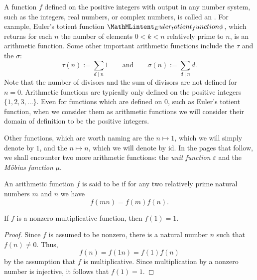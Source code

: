 A function $f$ defined on the positive integers with output in any number system, such as the integers, real numbers, or complex numbers, is called an . For example, Euler's totient function $\totient$, which returns for each $n$ the number of elements $0<k<n$ relatively prime to $n$, is an arithmetic function. Some other important arithmetic functions include the  $\tau$ and the  $\sigma$:
\begin{equation*}
  \tau(n) := \sum_{d\mid n}1\qquad\text{and}\qquad \sigma(n) := \sum_{d\mid n}d.
\end{equation*}
Note that the number of divisors and the sum of divisors are not defined for $n=0$. Arithmetic functions are typically only defined on the positive integers $\{1,2,3,\ldots\}$. Even for functions which are defined on $0$, such as Euler's totient function, when we consider them as arithmetic functions we will consider their domain of definition to be the positive integers.

Other functions, which are worth naming are the  $n\mapsto 1$, which we will simply denote by $1$, and the  $n\mapsto n$, which we will denote by $\mathrm{id}$. In the pages that follow, we shall encounter two more arithmetic functions: the \emph{unit function} $\varepsilon$ and the \emph{M\"obius function} $\mu$.

\begin{definition}
  An arithmetic function $f$ is said to be  if for any two relatively prime natural numbers $m$ and $n$ we have
  \begin{equation*}
    f(mn)=f(m)f(n).
  \end{equation*}
\end{definition}

\begin{proposition}
  If $f$ is a nonzero multiplicative function, then $f(1)=1$.
\end{proposition}

\begin{proof}
  Since $f$ is assumed to be nonzero, there is a natural number $n$ such that $f(n)\neq 0$. Thus,
  \begin{equation*}
    f(n)=f(1n)=f(1)f(n)
  \end{equation*}
  by the assumption that $f$ is multiplicative. Since multiplication by a nonzero number is injective, it follows that $f(1)=1$.
\end{proof}

